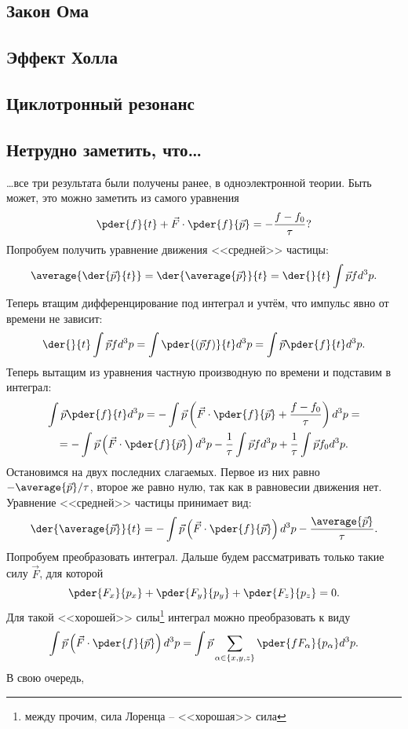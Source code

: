 \subsection{Закон Ома}
\subsection{Эффект Холла}
\subsection{Циклотронный резонанс}
\subsection{Нетрудно заметить, что\ldots}
\ldots все три результата были получены ранее, в одноэлектронной теории. Быть
может, это можно заметить из самого уравнения
\[
    \pder{f}{t} + \vec{F}\cdot\pder{f}{\vec{p}} = -\frac{f-f_0}{\tau}?
\]
Попробуем получить уравнение движения <<средней>> частицы:
\[
    \average{\der{\vec{p}}{t}} = \der{\average{\vec{p}}}{t} =
    \der{}{t}\int\vec{p} f d^3p.
\]
Теперь втащим дифференцирование под интеграл и учтём, что импульс явно от
времени не зависит:
\[
    \der{}{t}\int\vec{p} f d^3p = \int\pder{(\vec{p} f)}{t} d^3p =
    \int\vec{p}\pder{f}{t} d^3p.
\]
Теперь вытащим из уравнения частную производную по времени и подставим в
интеграл:
\begin{gather*}
    \int\vec{p}\pder{f}{t} d^3p = -\int\vec{p}
    \left(\vec{F}\cdot\pder{f}{\vec{p}} + \frac{f-f_0}{\tau}\right)d^3p = \\ =
    -\int\vec{p}\left(\vec{F}\cdot\pder{f}{\vec{p}}\right)d^3p
    -\frac{1}{\tau}\int\vec{p}fd^3p + \frac{1}{\tau}\int\vec{p}f_0d^3p.
\end{gather*}
Остановимся на двух последних слагаемых. Первое из них равно
\( -\average{\vec{p}}/\tau \), второе же равно нулю, так как в равновесии
движения нет. Уравнение <<средней>> частицы принимает вид:
\[
    \der{\average{\vec{p}}}{t} =
    -\int\vec{p}\left(\vec{F}\cdot\pder{f}{\vec{p}}\right)d^3p
    -\frac{\average{\vec{p}}}{\tau}.
\]
Попробуем преобразовать интеграл. Дальше будем рассматривать только такие силу
\( \vec{F} \), для которой
\[
    \pder{F_x}{p_x} + \pder{F_y}{p_y} + \pder{F_z}{p_z} = 0.
\]
Для такой <<хорошей>> силы\footnote{между прочим, сила Лоренца -- <<хорошая>>
сила} интеграл можно преобразовать к виду
\[
    \int\vec{p}\left(\vec{F}\cdot\pder{f}{\vec{p}}\right)d^3p =
    \int\vec{p}\sum_{\alpha\in\{x,y,z\}}\pder{fF_\alpha}{p_\alpha}d^3p.
\]
В свою очередь,
